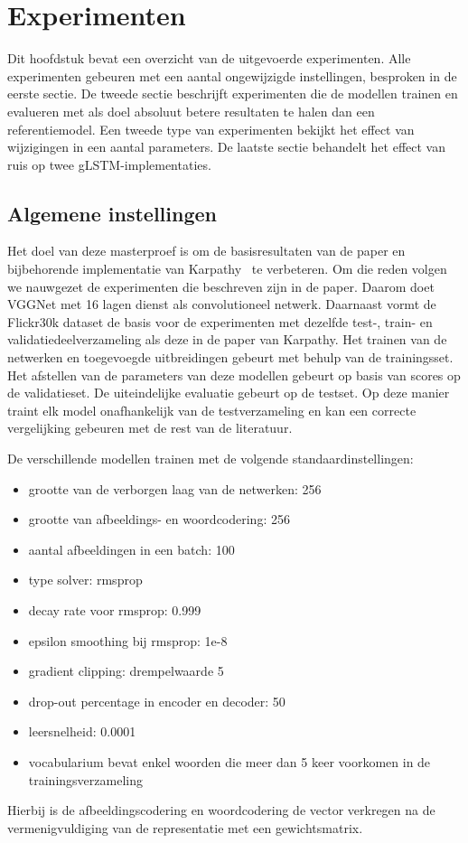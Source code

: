 \chapter{Experimenten} %
\label{cha:experimenten}
Dit hoofdstuk bevat een overzicht van de uitgevoerde experimenten. Alle experimenten gebeuren met een aantal ongewijzigde instellingen, besproken in de eerste sectie. De tweede sectie beschrijft experimenten die de modellen trainen en evalueren met als doel absoluut betere resultaten te halen dan een referentiemodel. Een tweede type van experimenten bekijkt het effect van wijzigingen in een aantal parameters. De laatste sectie behandelt het effect van ruis op twee gLSTM-implementaties.

\section{Algemene instellingen} %
\label{sec:eigen_implementaties_exp}
Het doel van deze masterproef is om de basisresultaten van de paper en bijbehorende implementatie van Karpathy~\cite{Karpathy2015} te verbeteren. Om die reden volgen we nauwgezet de experimenten die beschreven zijn in de paper. Daarom doet VGGNet met 16 lagen dienst als convolutioneel netwerk. Daarnaast vormt de Flickr30k dataset de basis voor de experimenten met dezelfde test-, train- en validatiedeelverzameling als deze in de paper van Karpathy. Het trainen van de netwerken en toegevoegde uitbreidingen gebeurt met behulp van de trainingsset. Het afstellen van de parameters van deze modellen gebeurt op basis van scores op de validatieset. De uiteindelijke evaluatie gebeurt op de testset. Op deze manier traint elk model onafhankelijk van de testverzameling en kan een correcte vergelijking gebeuren met de rest van de literatuur.

De verschillende modellen trainen met de volgende standaardinstellingen: 
\begin{itemize}
	\item grootte van de verborgen laag van de netwerken: 256
	\item grootte van afbeeldings- en woordcodering: 256
	\item aantal afbeeldingen in een batch: 100
	\item type solver: rmsprop
	\item decay rate voor rmsprop: 0.999
	\item epsilon smoothing bij rmsprop: 1e-8
	\item gradient clipping: drempelwaarde 5
	\item drop-out percentage in encoder en decoder: 50
	\item leersnelheid: 0.0001
	\item vocabularium bevat enkel woorden die meer dan 5 keer voorkomen in de trainingsverzameling
\end{itemize}Hierbij is de afbeeldingscodering en woordcodering de vector verkregen na de vermenigvuldiging van de representatie met een gewichtsmatrix.


